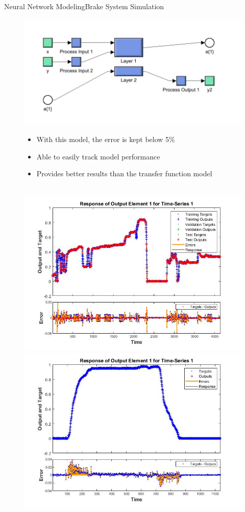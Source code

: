 \documentclass{beamer}
\begin{document}
\begin{frame}{Neural Network Modeling}{Brake System Simulation}
	\begin{block}{}
\begin{figure}[H]
  			\centering \includegraphics[width=.48\linewidth , height=.37\textheight]{figs/img/brakeNeuralNetworkDetailedSystem}\quad%
			\centering \begin{minipage}[b][0.4\textheight][c]{.45\linewidth}  \begin{itemize}
			\item With this model, the error is kept below 5\%
			\item Able to easily track model performance
			\item Provides better results than the transfer function model
			\end{itemize} \end{minipage}\\[1em]
			\centering \includegraphics[width=.45\linewidth , height=.37\textheight]{figs/img/brake_new_neuralNetworkFig.jpg}\quad%
			\centering \includegraphics[width=.45\linewidth , height=.37\textheight]{figs/img/brake_new_neuralNetworkFigLog2Test.jpg}
  		\end{figure}
	
  \end{block}
\end{frame}
\end{document}
